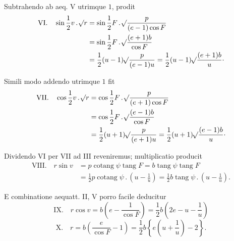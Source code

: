 Subtrahendo ab aeq. V utrimque $1$, prodit
\[
\begin{aligned}
\mathrm{VI.}\quad\sin\frac{1}{2}v\, .\,\mathord{{}^{}\!\surd}r&=\sin\frac{1}{2}F\, .\,\mathord{{}^{}\!\surd}\frac{p}{(e-1)\cos F}\\
&=\sin\frac{1}{2}F\, .\,\mathord{{}^{}\!\surd}\frac{(e+1)b}{\cos F}\\
&=\frac{1}{2}(u-1)\mathord{{}^{}\!\surd}\frac{p}{(e-1)u}=\frac{1}{2}(u-1)\mathord{{}^{}\!\surd}\frac{(e+1)b}{u}\cdot
\end{aligned}
\]

Simili modo addendo utrimque $1$ fit
\[
\begin{aligned}
\mathrm{VII.}\quad\cos\frac{1}{2}v\, .\,\mathord{{}^{}\!\surd}r&=\cos\frac{1}{2}F\, .\,\mathord{{}^{}\!\surd}\frac{p}{(e+1)\cos F}\\
&=\cos\frac{1}{2}F\, .\,\mathord{{}^{}\!\surd}\frac{(e-1)b}{\cos F}\\
&=\frac{1}{2}(u+1)\mathord{{}^{}\!\surd}\frac{p}{(e+1)u}=\frac{1}{2}(u+1)\mathord{{}^{}\!\surd}\frac{(e-1)b}{u}\cdot
\end{aligned}
\]

Dividendo VI per VII ad III reveniremus; multiplicatio producit
\[
\begin{aligned}
\mathrm{VIII.}\quad r\sin v&=p\operatorname{cotang}\psi\operatorname{tang}F=b\operatorname{tang}\psi\operatorname{tang}F\\
&=\frac{1}{2}p\operatorname{cotang}\psi\, .\,\left(u-\frac{1}{u}\right)=\frac{1}{2}b\operatorname{tang}\psi\, .\,\left(u-\frac{1}{u}\right).
\end{aligned}
\]

E combinatione aequatt. II, V porro facile deducitur
\[
\mathrm{IX.}\quad r\cos v=b\left(e-\frac{1}{\cos F}\right)=\frac{1}{2}b\left(2e-u-\frac{1}{u}\right)
\]
\[
\mathrm{X.}\quad r=b\left(\frac{e}{\cos F}-1\right)=\frac{1}{2}b\left\{e\left(u+\frac{1}{u}\right)-2\right\}.
\]
